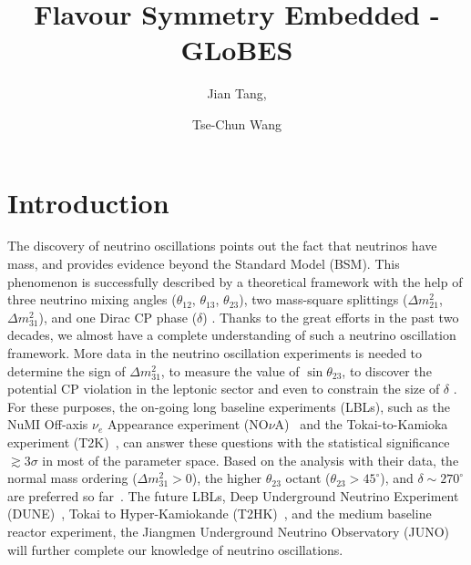 \documentclass[a4paper,11pt]{article}
\title{\boldmath  Flavour Symmetry Embedded - GLoBES}
\author[a]{Jian Tang,}
\author[a]{Tse-Chun Wang}
\affiliation[a]{School of Physics, Sun Yat-Sen University, Guangzhou 510275, China}
\begin{document}
 
\maketitle
\flushbottom

\section{Introduction}\label{sec:intro}

The discovery of neutrino oscillations points out the fact that neutrinos have mass, and provides evidence beyond the Standard Model (BSM). This phenomenon is successfully described by a theoretical framework with the help of three neutrino mixing angles ($\theta_{12}$, $\theta_{13}$, $\theta_{23}$), two mass-square splittings ($\Delta m_{21}^2$, $\Delta m_{31}^2$), and one Dirac CP phase ($\delta$) \cite{Pontecorvo:1967fh,Maki:1962mu,Pontecorvo:1957qd,Esteban:2018azc}. Thanks to the great efforts in the past two decades, we almost have a complete understanding of such a neutrino oscillation framework. More data in the neutrino oscillation experiments is needed to determine the sign of $\Delta m_{31}^2$, to measure the value of $\sin\theta_{23}$, to discover the potential CP violation in the leptonic sector and even to constrain the size of $\delta$ \cite{Esteban:2018azc}. For these purposes, the on-going long baseline experiments (LBLs), such as the NuMI Off-axis $\nu_e$ Appearance experiment (NO$\nu$A)~\cite{Ayres:2007tu} and the Tokai-to-Kamioka experiment (T2K)~\cite{Abe:2011ks}, can answer these questions with the statistical significance $\gtrsim 3\sigma$ in most of the parameter space. Based on the analysis with their data, the normal mass ordering ($\Delta m_{31}^2>0$), the higher $\theta_{23}$ octant ($\theta_{23}>45^\circ$), and $\delta\sim270^\circ$ are preferred so far~\cite{Esteban:2018azc}. The future LBLs, Deep Underground Neutrino Experiment (DUNE)~\cite{Acciarri:2015uup}, Tokai to Hyper-Kamiokande (T2HK)~\cite{Abe:2014oxa}, and the medium baseline reactor experiment, the Jiangmen Underground Neutrino Observatory (JUNO)~\cite{Djurcic:2015vqa,An:2015jdp} will further complete our knowledge of neutrino oscillations.
\end{document}

